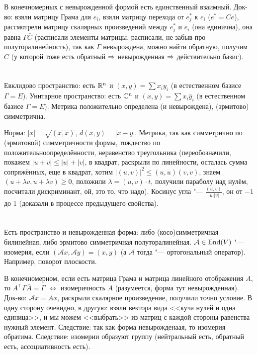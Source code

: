 В конечномерных с невырожденной формой есть единственный взаимный.
Док-во: взяли матрицу Грама для $e_i$, взяли матрицу перехода от $e_j^*$ к $e_i$ ($e^*=Ce$), рассмотрели
матрицу скалярных произведений между $e_j^*$ и $e_i$ (она единична), она равна $\Gamma \bar C$ (расписали элементы матрицы, расписали, не забыв про полуторалинейность),
так как $\Gamma$ невырождена, можно найти обратную, получим $C$ (у которой тоже есть обратный $\Rightarrow$ невырожденная $\Rightarrow$ действительно базис).

\section{} %
Евклидово пространство: есть $\mathbb{R}^n$ и $(x, y) = \sum x_iy_i$ (в естественном базисе $\Gamma=E$).
Унитарное пространство: есть $\mathbb{C}^n$ и $(x, y) = \sum x_i\bar y_i$ (в естественном базисе $\Gamma=E$).
Метрика положительно определена (и невырождена), (эрмитово) симметрична.

Норма: $|x|=\sqrt{(x,x)}$, $d(x, y)=|x-y|$.
Метрика, так как симметрично по (эрмитовой) симметричности формы, тождество по положительноопределённости,
неравенство треугольника (переобозначили, покажем $|u+v|\le|u|+|v|$, в квадрат, раскрыли по линейности,
осталась сумма сопряжённых, еще в квадрат, хотим $|(u,v)|^2 \le (u,u)(v,v)$, знаем $(u+\lambda v, u+\lambda v) \ge 0$,
положили $\lambda=(u, v)\cdot t$, получили параболу над нулём, посчитали дискриминант, ой, это то, что надо).
Косинус угла "--- $\frac{(u,v)}{|u||v|}$, он от $-1$ до $1$ (доказали в процессе предыдущего свойства).

\section{} %
Есть пространство и невырожденная форма: либо (косо)симметричная билинейная, либо эрмитово симметричная полуторалинейная.
$\mathcal{A} \in \operatorname{End}(V)$ "--- изомерия, если $(\mathcal{A}x, \mathcal{A}y) = (x, y)$ (а $\mathcal{A}$ тогда "--- ортогональный оператор).
Например, поворот плоскости.

В конечномерном, если есть матрица Грама и матрица линейного отображения $A$, то $A^\top \Gamma \bar A = \Gamma$ $\iff$ изомеричность $A$ (разумеется, форма тут невырожденная).
Док-во: $\mathcal{A} x = Ax$, раскрыли скалярное произведение, получили точно условие.
В одну сторону очевидно, в другую: взяли вектора вида <<куча нулей и одна единица>>, и мы можем <<выбрать>> из матриц с каждой стороны равенства нужный элемент.
Следствие: так как форма невырожденаая, то изомерия обратима.
Следствие: изомерии образуют группу (нейтральный есть, обратный есть, ассоциативность есть).

